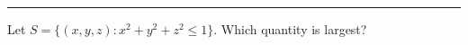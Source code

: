 \documentclass{ximera}
\begin{document}



\hrule

\begin{problem}
  Let $S = \{(x,y,z): x^2 +y^2 + z^2 \le 1\}$. Which quantity is largest?
  \begin{multipleChoice}
      \pdfOnly{\end{multicols}}
    \end{multipleChoice}
\end{problem}
\end{document}
